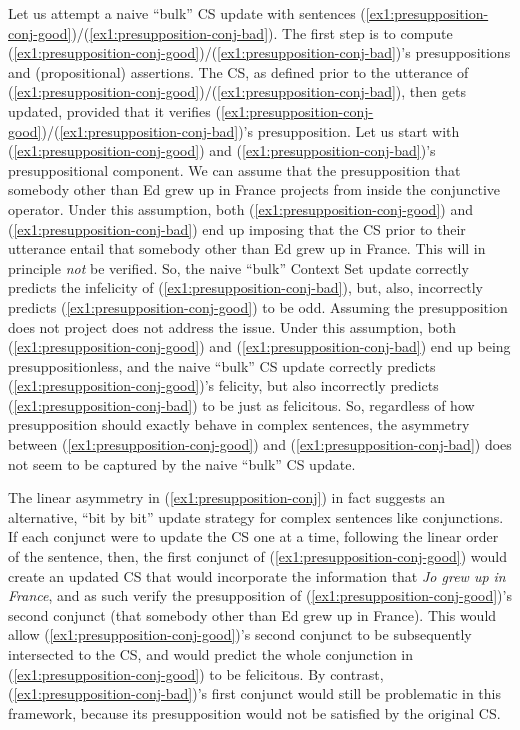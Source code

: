 Let us attempt a naive ``bulk'' CS update with sentences (\ref{ex1:presupposition-conj-good})/(\ref{ex1:presupposition-conj-bad}). The first step is to compute (\ref{ex1:presupposition-conj-good})/(\ref{ex1:presupposition-conj-bad})'s presuppositions and (propositional) assertions. The CS, as defined prior to the utterance of (\ref{ex1:presupposition-conj-good})/(\ref{ex1:presupposition-conj-bad}), then gets updated, provided that it verifies (\ref{ex1:presupposition-conj-good})/(\ref{ex1:presupposition-conj-bad})'s presupposition. Let us start with (\ref{ex1:presupposition-conj-good}) and (\ref{ex1:presupposition-conj-bad})'s presuppositional component. We can assume that the presupposition that somebody other than Ed grew up in France projects from inside the conjunctive operator. Under this assumption, both (\ref{ex1:presupposition-conj-good}) and (\ref{ex1:presupposition-conj-bad}) end up imposing that the CS prior to their utterance entail that somebody other than Ed grew up in France. This will in principle \textit{not} be verified. So, the naive ``bulk'' Context Set update correctly predicts the infelicity of (\ref{ex1:presupposition-conj-bad}), but, also, incorrectly predicts (\ref{ex1:presupposition-conj-good}) to be odd. Assuming the presupposition does not project does not address the issue. Under this assumption, both (\ref{ex1:presupposition-conj-good}) and (\ref{ex1:presupposition-conj-bad}) end up being presuppositionless, and the naive ``bulk'' CS update correctly predicts (\ref{ex1:presupposition-conj-good})'s felicity, but also incorrectly predicts (\ref{ex1:presupposition-conj-bad}) to be just as felicitous. So, regardless of how presupposition should exactly behave in complex sentences, the asymmetry between (\ref{ex1:presupposition-conj-good}) and (\ref{ex1:presupposition-conj-bad}) does not seem to be captured by the naive ``bulk'' CS update. 

The linear asymmetry in (\ref{ex1:presupposition-conj}) in fact suggests an alternative, ``bit by bit'' update strategy for complex sentences like conjunctions. If each conjunct were to update the CS one at a time, following the linear order of the sentence, then, the first conjunct of (\ref{ex1:presupposition-conj-good}) would create an updated CS that would incorporate the information that \textit{Jo grew up in France}, and as such verify the presupposition of (\ref{ex1:presupposition-conj-good})'s second conjunct (that somebody other than Ed grew up in France). This would allow (\ref{ex1:presupposition-conj-good})'s second conjunct to be subsequently intersected to the CS, and would predict the whole conjunction in (\ref{ex1:presupposition-conj-good}) to be felicitous. By contrast, (\ref{ex1:presupposition-conj-bad})'s first conjunct would still be problematic in this framework, because its presupposition would not be satisfied by the original CS. 

